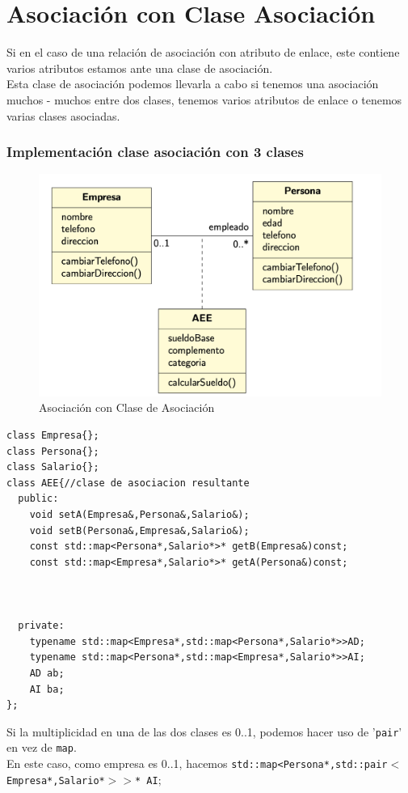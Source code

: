 \chapter{Asociación con Clase Asociación}
Si en el caso de una relación de asociación con atributo de enlace, este contiene varios atributos estamos ante una clase de asociación.\\
Esta clase de asociación podemos llevarla a cabo si tenemos una asociación muchos - muchos entre dos clases, tenemos varios atributos de enlace o tenemos varias clases asociadas.
\subsection{Implementación clase asociación con 3 clases}
\begin{figure}[h]
    \centering
    \includegraphics[width=\textwidth]{Imagenes/AClS.png}
    \caption{Asociación con Clase de Asociación}
\end{figure}
\begin{lstlisting}[frame=single]
class Empresa{};
class Persona{};
class Salario{};
class AEE{//clase de asociacion resultante
  public:
    void setA(Empresa&,Persona&,Salario&);
    void setB(Persona&,Empresa&,Salario&);
    const std::map<Persona*,Salario*>* getB(Empresa&)const;
    const std::map<Empresa*,Salario*>* getA(Persona&)const;



  private:
    typename std::map<Empresa*,std::map<Persona*,Salario*>>AD;
    typename std::map<Persona*,std::map<Empresa*,Salario*>>AI;
    AD ab;
    AI ba;
};
\end{lstlisting}
Si la multiplicidad en una de las dos clases es 0..1, podemos hacer uso de '\texttt{pair}' en vez de \texttt{map}.\\
En este caso, como empresa es 0..1, hacemos \texttt{std::map<Persona*,std::pair$<$Empresa*,Salario*$>$$>$* AI$;$}
